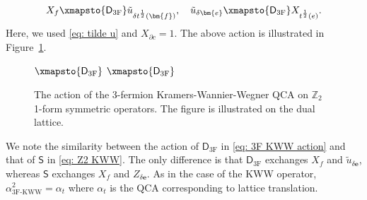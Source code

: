 \documentclass[aps,twocolumn,prx,floatfix,preprintnumbers, nofootinbib,10pt]{revtex4-2}
\numberwithin{equation}{section}
\theoremstyle{definition}
\theoremstyle{remark}
\theoremstyle{claim}
\newcommand{\athreeF}{\alpha_\text{3F-KWW}}
\renewcommand{\sf}[1]{\mathsf{#1}}
\begin{document}
\begin{equation}
X_f \xmapsto{\sf{D}_\text{3F}} \tilde{u}_{\delta t^{\frac{1}{2}}(\bm{f})}, \quad
\tilde{u}_{\delta \bm{e}} \xmapsto{\sf{D}_\text{3F}} X_{t^{\frac{1}{2}}(e)}.
\label{eq: 3F KWW action}
\end{equation}
Here, we used \eqref{eq: tilde u} and $X_{\partial c} = 1$.
The above action is illustrated in Figure~\ref{fig: 3F KWW}.
\begin{figure}
\centering
{}
$\xmapsto{\sf{D}_\text{3F}}$
$\xmapsto{\sf{D}_\text{3F}}$
\caption{The action of the 3-fermion Kramers-Wannier-Wegner QCA on $\mathbb{Z}_2$ 1-form symmetric operators. The figure is illustrated on the dual lattice.}
\label{fig: 3F KWW}
\end{figure}
We note the similarity between the action of $\mathsf{D}_\text{3F}$ in \eqref{eq: 3F KWW action} and that of $\mathsf{S}$ in \eqref{eq: Z2 KWW}.
The only difference is that $\mathsf{D}_\text{3F}$ exchanges $X_f$ and $\tilde{u}_{\delta \bm{e}}$, whereas $\mathsf{S}$ exchanges $X_f$ and $Z_{\delta \bm{e}}$.
As in the case of the KWW operator, $\athreeF^2 = \alpha_t$ where $\alpha_t$ is the QCA corresponding to lattice translation.
\end{document}
